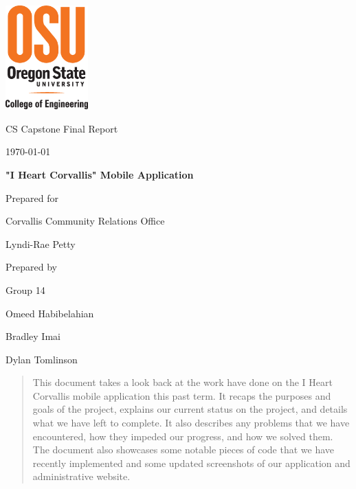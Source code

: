 \documentclass[onecolumn, draftclsnofoot,10pt, compsoc]{IEEEtran}
\def \CapstoneTeamName{		The Cleverly Named Team}
\def \CapstoneTeamNumber{		14}
\def \GroupMemberOne{			Omeed Habibelahian}
\def \GroupMemberTwo{			Bradley Imai}
\def \GroupMemberThree{			Dylan Tomlinson}
\def \CapstoneProjectName{		"I Heart Corvallis" Mobile Application}
\def \CapstoneSponsorCompany{	Corvallis Community Relations Office}
\def \CapstoneSponsorPerson{		Lyndi-Rae Petty}
\def \DocType{		%
        Final Report
				}
\newcommand{\NameSigPair}[1]{\par
\makebox[2.75in][r]{#1} \hfil 	\makebox[3.25in]{\makebox[2.25in]{\hrulefill} \hfill		\makebox[.75in]{\hrulefill}}
\par\vspace{-12pt} \textit{\tiny\noindent
\makebox[2.75in]{} \hfil		\makebox[3.25in]{\makebox[2.25in][r]{Signature} \hfill	\makebox[.75in][r]{Date}}}}
\renewcommand{\NameSigPair}[1]{#1}
\begin{document}
\begin{titlepage}
    \begin{singlespace}
    	\includegraphics[height=4cm]{coe_v_spot1}
        \hfill
        \par\vspace{.2in}
        \centering
        \scshape{
            \huge CS Capstone \DocType \par
            {\large\today}\par
            \vspace{.5in}
            \textbf{\Huge\CapstoneProjectName}\par
            \vfill
            {\large Prepared for}\par
            \Huge \CapstoneSponsorCompany\par
            \vspace{5pt}
            {\Large\NameSigPair{\CapstoneSponsorPerson}\par}
            {\large Prepared by }\par
            Group\CapstoneTeamNumber\par
            \vspace{5pt}
            {\Large
                \NameSigPair{\GroupMemberOne}\par
                \NameSigPair{\GroupMemberTwo}\par
                \NameSigPair{\GroupMemberThree}\par
            }
            \vspace{20pt}
        }
        \begin{abstract}
        		This document takes a look back at the work have done on the I Heart Corvallis mobile application this past term. It recaps the purposes and goals of the project, explains our current status on the project, and details what we have left to complete. It also describes any problems that we have encountered, how they impeded our progress, and how we solved them. The document also showcases some notable pieces of code that we have recently implemented and some updated screenshots of our application and administrative website.
        \end{abstract}
    \end{singlespace}
\end{titlepage}
\newpage
{}
\tableofcontents
\clearpage
\end{document}
